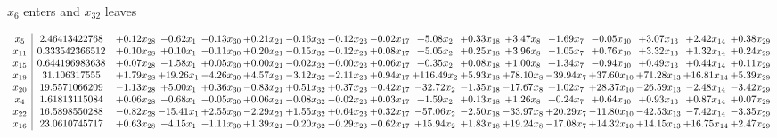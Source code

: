 \documentclass[9pt]{article}
\begin{document}
 $ x_{6} $ enters and $ x_{32} $ leaves 

 \[\begin{array}{c| c c@{\hskip 2pt} c@{\hskip 2pt} c@{\hskip 2pt} c@{\hskip 2pt} c@{\hskip 2pt} c@{\hskip 2pt} c@{\hskip 2pt} c@{\hskip 2pt} c@{\hskip 2pt} c@{\hskip 2pt} c@{\hskip 2pt} c@{\hskip 2pt} c@{\hskip 2pt} c@{\hskip 2pt} c@{\hskip 2pt} }
 x_{5}   &  2.46413422768 & +  0.12 x_{28} & -0.62 x_{1} & -0.13 x_{30} & +  0.21 x_{21} & -0.16 x_{32} & -0.12 x_{23} & -0.02 x_{17} & +  5.08 x_{2} & +  0.33 x_{18} & +  3.47 x_{8} & -1.69 x_{7} & -0.05 x_{10} & +  3.07 x_{13} & +  2.42 x_{14} & +  0.38 x_{29}\\
 x_{11}   &  0.333542366512 & +  0.10 x_{28} & +  0.10 x_{1} & -0.11 x_{30} & +  0.20 x_{21} & -0.15 x_{32} & -0.12 x_{23} & +  0.08 x_{17} & +  5.05 x_{2} & +  0.25 x_{18} & +  3.96 x_{8} & -1.05 x_{7} & +  0.76 x_{10} & +  3.32 x_{13} & +  1.32 x_{14} & +  0.24 x_{29}\\
 x_{15}   &  0.644196983638 & +  0.07 x_{28} & -1.58 x_{1} & +  0.05 x_{30} & +  0.00 x_{21} & -0.02 x_{32} & -0.00 x_{23} & +  0.06 x_{17} & +  0.35 x_{2} & +  0.08 x_{18} & +  1.00 x_{8} & +  1.34 x_{7} & -0.94 x_{10} & +  0.49 x_{13} & +  0.44 x_{14} & +  0.11 x_{29}\\
 x_{19}   &  31.106317555 & +  1.79 x_{28} & + 19.26 x_{1} & -4.26 x_{30} & +  4.57 x_{21} & -3.12 x_{32} & -2.11 x_{23} & +  0.94 x_{17} & + 116.49 x_{2} & +  5.93 x_{18} & + 78.10 x_{8} & -39.94 x_{7} & + 37.60 x_{10} & + 71.28 x_{13} & + 16.81 x_{14} & +  5.39 x_{29}\\
 x_{20}   &  19.5571066209 & -1.13 x_{28} & +  5.00 x_{1} & +  0.36 x_{30} & -0.83 x_{21} & +  0.51 x_{32} & +  0.37 x_{23} & -0.42 x_{17} & -32.72 x_{2} & -1.35 x_{18} & -17.67 x_{8} & +  1.02 x_{7} & + 28.37 x_{10} & -26.59 x_{13} & -2.48 x_{14} & -3.42 x_{29}\\
 x_{4}   &  1.61813115084 & +  0.06 x_{28} & -0.68 x_{1} & -0.05 x_{30} & +  0.06 x_{21} & -0.08 x_{32} & -0.02 x_{23} & +  0.03 x_{17} & +  1.59 x_{2} & +  0.13 x_{18} & +  1.26 x_{8} & +  0.24 x_{7} & +  0.64 x_{10} & +  0.93 x_{13} & +  0.87 x_{14} & +  0.07 x_{29}\\
 x_{22}   &  16.5898550288 & -0.82 x_{28} & -15.41 x_{1} & +  2.55 x_{30} & -2.29 x_{21} & +  1.55 x_{32} & +  0.64 x_{23} & +  0.32 x_{17} & -57.06 x_{2} & -2.50 x_{18} & -33.97 x_{8} & + 20.29 x_{7} & -11.80 x_{10} & -42.53 x_{13} & -7.42 x_{14} & -3.35 x_{29}\\
 x_{16}   &  23.0610745717 & +  0.63 x_{28} & -4.15 x_{1} & -1.11 x_{30} & +  1.39 x_{21} & -0.20 x_{32} & -0.29 x_{23} & -0.62 x_{17} & + 15.94 x_{2} & +  1.83 x_{18} & + 19.24 x_{8} & -17.08 x_{7} & + 14.32 x_{10} & + 14.15 x_{13} & + 16.75 x_{14} & +  2.47 x_{29}\\

\end{array}\]
\end{document}
